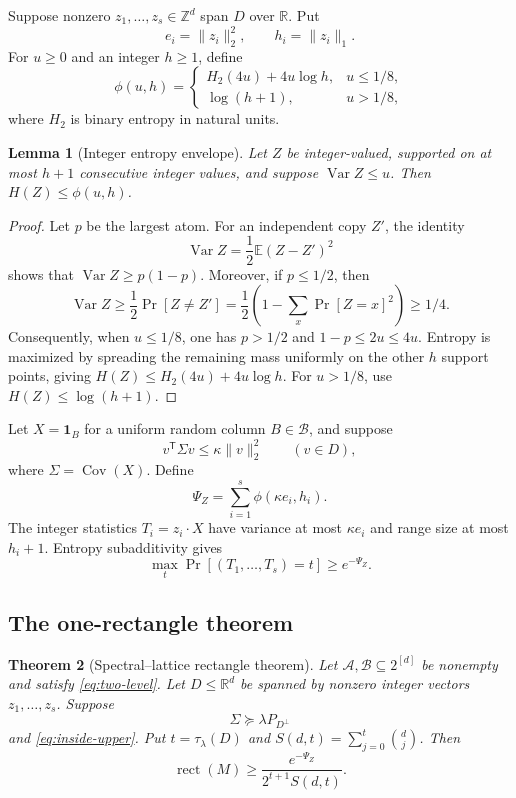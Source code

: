 \documentclass[11pt]{article}
\newtheorem{theorem}{Theorem}[section]
\newtheorem{lemma}[theorem]{Lemma}
\theoremstyle{definition}
\theoremstyle{remark}
\newcommand{\cA}{\mathcal A}
\newcommand{\cB}{\mathcal B}
\newcommand{\R}{\mathbb R}
\newcommand{\Z}{\mathbb Z}
\newcommand{\1}{\mathbf 1}
\newcommand{\Cov}{\operatorname{Cov}}
\newcommand{\Var}{\operatorname{Var}}
\newcommand{\rect}{\operatorname{rect}}
\begin{document}
Suppose nonzero $z_1,\ldots,z_s\in\Z^d$ span $D$ over $\R$.  Put
\[
 e_i=\|z_i\|_2^2,
 \qquad h_i=\|z_i\|_1.
\]
For $u\ge0$ and an integer $h\ge1$, define
\[
 \phi(u,h)=
 \begin{cases}
 H_2(4u)+4u\log h,&u\le1/8,\\
 \log(h+1),&u>1/8,
 \end{cases}
\]
where $H_2$ is binary entropy in natural units.

\begin{lemma}[Integer entropy envelope]\label{lem:entropy-envelope}
Let $Z$ be integer-valued, supported on at most $h+1$ consecutive integer
values, and suppose $\Var Z\le u$.  Then $H(Z)\le\phi(u,h)$.
\end{lemma}

\begin{proof}
Let $p$ be the largest atom.  For an independent copy $Z'$, the identity
\[
 \Var Z=\frac12\mathbb E(Z-Z')^2
\]
shows that $\Var Z\ge p(1-p)$.  Moreover, if $p\le1/2$, then
\[
 \Var Z\ge\frac12\Pr[Z\ne Z']
 =\frac12\left(1-\sum_x\Pr[Z=x]^2\right)\ge1/4.
\]
Consequently, when $u\le1/8$, one has $p>1/2$ and
$1-p\le2u\le4u$.  Entropy is maximized by spreading the remaining mass
uniformly on the other $h$ support points, giving
$H(Z)\le H_2(4u)+4u\log h$.  For $u>1/8$, use
$H(Z)\le\log(h+1)$.
\end{proof}

Let $X=\1_B$ for a uniform random column $B\in\cB$, and suppose
\begin{equation}\label{eq:inside-upper}
 v^\mathsf T\Sigma v\le\kappa\|v\|_2^2
 \qquad(v\in D),
\end{equation}
where $\Sigma=\Cov(X)$.  Define
\begin{equation}\label{eq:psi}
 \Psi_Z=\sum_{i=1}^s\phi(\kappa e_i,h_i).
\end{equation}
The integer statistics $T_i=z_i\cdot X$ have variance at most $\kappa e_i$
and range size at most $h_i+1$.  Entropy subadditivity gives
\begin{equation}\label{eq:joint-atom}
 \max_t\Pr[(T_1,\ldots,T_s)=t]\ge e^{-\Psi_Z}.
\end{equation}

\subsection{The one-rectangle theorem}

\begin{theorem}[Spectral--lattice rectangle theorem]
\label{thm:master}
Let $\cA,\cB\subseteq2^{[d]}$ be nonempty and satisfy
\eqref{eq:two-level}.  Let $D\le\R^d$ be spanned by nonzero integer vectors
$z_1,\ldots,z_s$.  Suppose
\begin{equation}\label{eq:outside-gap}
 \Sigma\succeq\lambda P_{D^\perp}
\end{equation}
and \eqref{eq:inside-upper}.  Put $t=\tau_\lambda(D)$ and
$S(d,t)=\sum_{j=0}^t\binom dj$.  Then
\begin{equation}\label{eq:master-bound}
 \rect(M)\ge
 \frac{e^{-\Psi_Z}}{2^{t+1}S(d,t)}.
\end{equation}
\end{theorem}
\end{document}
